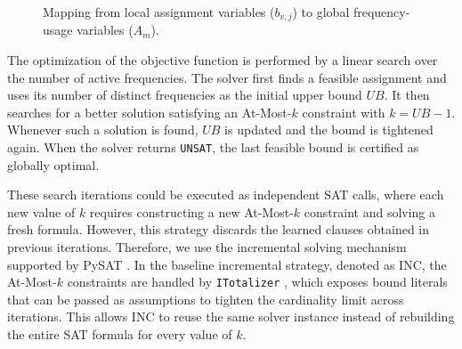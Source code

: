 \documentclass[letterpaper,journal]{IEEEtran}
\begin{document}
\begin{figure}[!htbp]
{%
}
\caption{Mapping from local assignment variables ($b_{v,j}$) to global frequency-usage variables ($A_m$).}
\label{fig:b_to_A_implication}
\end{figure}

The optimization of the objective function is performed by a linear search over the number of active frequencies. The solver first finds a feasible assignment and uses its number of distinct frequencies as the initial upper bound $UB$. It then searches for a better solution satisfying an At-Most-$k$ constraint with $k=UB-1$. Whenever such a solution is found, $UB$ is updated and the bound is tightened again. When the solver returns \texttt{UNSAT}, the last feasible bound is certified as globally optimal.

These search iterations could be executed as independent SAT calls, where each new value of $k$ requires constructing a new At-Most-$k$ constraint and solving a fresh formula. However, this strategy discards the learned clauses obtained in previous iterations. Therefore, we use the incremental solving mechanism supported by PySAT \cite{imms-sat18,itk-sat24}. In the baseline incremental strategy, denoted as INC, the At-Most-$k$ constraints are handled by \texttt{ITotalizer} \cite{martins2014incremental,Bailleux2003}, which exposes bound literals that can be passed as assumptions to tighten the cardinality limit across iterations. This allows INC to reuse the same solver instance instead of rebuilding the entire SAT formula for every value of $k$.
\end{document}
